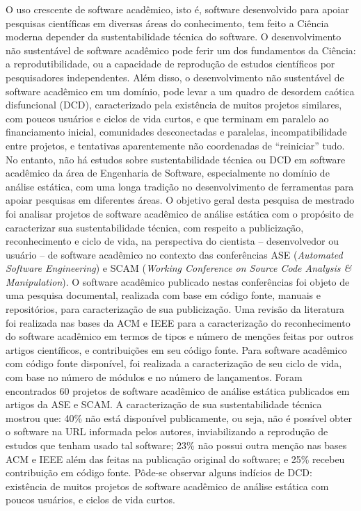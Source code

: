 O uso crescente de software acadêmico, isto é, software desenvolvido para
apoiar pesquisas científicas em diversas áreas do conhecimento, tem feito
a Ciência moderna depender da sustentabilidade técnica do software.
%
O desenvolvimento não sustentável de software acadêmico pode ferir um dos
fundamentos da Ciência: a reprodutibilidade, ou a capacidade de reprodução de
estudos científicos por pesquisadores independentes.
%
Além disso, o desenvolvimento não sustentável de software acadêmico em um
domínio, pode levar a um quadro de desordem caótica disfuncional (DCD),
caracterizado pela existência de muitos projetos similares, com poucos usuários
e ciclos de vida curtos, e que terminam em paralelo ao financiamento inicial,
comunidades desconectadas e paralelas, incompatibilidade entre projetos, e
tentativas aparentemente não coordenadas de ``reiniciar'' tudo.
%
No entanto, não há %
estudos sobre sustentabilidade técnica ou DCD em software acadêmico da
área de Engenharia de Software, especialmente no domínio de análise estática,
com uma longa tradição no desenvolvimento de ferramentas para apoiar pesquisas
em diferentes áreas.
%
O objetivo geral desta pesquisa de mestrado foi analisar projetos de
software acadêmico de análise estática 
com o propósito de caracterizar sua sustentabilidade técnica, 
com respeito a publicização, reconhecimento e ciclo de vida, 
na perspectiva do cientista -- desenvolvedor ou usuário -- de software
acadêmico no contexto das conferências 
ASE ({\it Automated Software Engineering}) e SCAM ({\it Working Conference on Source Code
Analysis \& Manipulation}).
%
O software acadêmico publicado nestas conferências 
foi objeto de uma pesquisa documental, realizada com base em código fonte, 
manuais e repositórios, para caracterização de sua publicização.
%
Uma revisão da literatura foi realizada nas bases da ACM e IEEE
para a caracterização do reconhecimento do software acadêmico
em termos de tipos e número de menções feitas por outros artigos científicos, e
contribuições em seu código fonte.
%
Para software acadêmico com código fonte disponível, 
foi realizada a caracterização de seu ciclo de vida,
com base no número de módulos e no número de lançamentos.
%
Foram encontrados 60 projetos de software acadêmico de análise estática
publicados em artigos da ASE e SCAM.
%
A caracterização de sua sustentabilidade técnica mostrou que: 
40\% não está disponível publicamente, ou seja, não é possível obter 
o software na URL informada pelos autores, inviabilizando 
a reprodução de estudos que tenham usado tal software;
%
23\% não possui outra menção nas bases ACM e IEEE além das feitas na publicação original
do software; e 25\% recebeu contribuição em código fonte.
%
Pôde-se observar alguns indícios de DCD: 
existência de muitos projetos de software acadêmico de análise estática
com poucos usuários, e ciclos de vida curtos.
